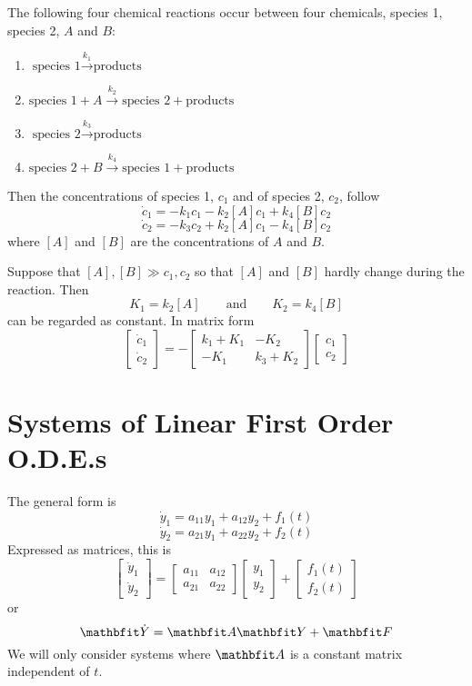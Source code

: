 \begin{example}
The following four chemical reactions occur between four chemicals, species 
1, species 2, $A$ and $B$:
\begin{enumerate}
\item $\mbox{species 1}\stackrel{k_1}{\rightarrow}\mbox{products}$
\item $\mbox{species 1}+A\stackrel{k_2}{\rightarrow}\mbox{species 2}+\mbox{products}$
\item $\mbox{species 2}\stackrel{k_3}{\rightarrow}\mbox{products}$
\item $\mbox{species 2}+B\stackrel{k_4}{\rightarrow}\mbox{species 1}+\mbox{products}$
\end{enumerate}
Then the concentrations of species 1, $c_1$ and of species 2, $c_2$, follow
$$\dot{c}_1=-k_1c_1-k_2[A]c_1+k_4[B]c_2$$
$$\dot{c}_2=-k_3c_2+k_2[A]c_1-k_4[B]c_2$$
where $[A]$ and $[B]$ are the concentrations of $A$ and $B$.

Suppose that $[A],[B]\gg c_1,c_2$ so that $[A]$ and $[B]$ hardly change
during the reaction.  Then
$$K_1=k_2[A]\qquad\mbox{and}\qquad K_2=k_4[B]$$
can be regarded as constant.  In matrix form
$$\begin{bmatrix}\dot{c}_1 \\\dot{c}_2\end{bmatrix}=
-\begin{bmatrix}     k_1+K_1 & -K_2 \\ -K_1 & k_3+K_2 	 \end{bmatrix}
\begin{bmatrix}c_1 \\c_2\end{bmatrix}$$
\end{example}

\section{Systems of Linear First Order O.D.E.s}

The general form is
$$\dot{y}_1=a_{11}y_1+a_{12}y_2+f_1(t)$$
$$\dot{y}_2=a_{21}y_1+a_{22}y_2+f_2(t)$$
Expressed as matrices, this is
$$\begin{bmatrix}\dot{y}_1 \\\dot{y}_2\end{bmatrix}=
\begin{bmatrix}  a_{11} & a_{12} \\ a_{21} & a_{22} 	\end{bmatrix}
\begin{bmatrix}   y_1 \\ y_2				\end{bmatrix}
+\begin{bmatrix}  f_1(t) \\ f_2(t)			\end{bmatrix}$$
or
$$\vect{\dot{Y}}=\vect{A}\vect{Y}+\vect{F}$$
We will only consider systems where $\vect{A}$ is a constant matrix
independent of $t$.

